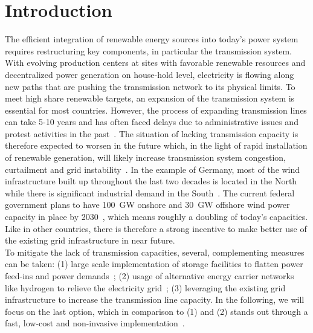 \documentclass[preprint,12pt]{elsarticle}
\begin{document}
\section{Introduction}

The efficient integration of renewable energy sources into today's power system requires restructuring key components, in particular the transmission system. With evolving production centers at sites with favorable renewable resources and decentralized power generation on house-hold level, electricity is flowing along new paths that are pushing the transmission network to its physical limits.
To meet high share renewable targets, an expansion of the transmission system is essential for most countries.
However, the process of expanding transmission lines can take 5-10 years \cite{michiorriForecastingDynamicLine2015} and has often faced delays due to administrative issues and protest activities in the past~\cite{neukirchProtestsGermanElectricity2016}. The situation of lacking transmission capacity is therefore expected to worsen in the future which, in the light of rapid installation of renewable generation, will likely increase transmission system congestion, curtailment and grid instability~\cite{erdincComprehensiveOverviewDynamic2020}.
In the example of Germany, most of the wind infrastructure built up throughout the last two decades is located in the North while there is significant industrial demand in the South~\cite{kuhneConflictsNegotiationProcesses2018}.
The current federal government plans to have 100~GW onshore and 30~GW offshore wind power capacity in place by 2030~\cite{federalministryofeconomicaffairsandclimateactionGermanyCurrentClimate2022}, which means roughly a doubling of today's capacities. Like in other countries, there is therefore a strong incentive to make better use of the existing grid infrastructure in near future. \\


To mitigate the lack of transmission capacities, several, complementing measures can be taken:  (1) large scale implementation of storage facilities to flatten power feed-ins and power demands~\cite{caoPreventPromoteGrid2021}; (2) usage of alternative energy carrier networks like hydrogen to relieve the electricity grid~\cite{welderDesignEvaluationHydrogen2019}; (3) leveraging the existing grid infrastructure to increase the transmission line capacity. In the following, we will focus on the last option, which in comparison to (1) and (2) stands out through a fast, low-cost and non-invasive implementation~\cite{minguezApplicationDigitalElevation2022}.
\end{document}
